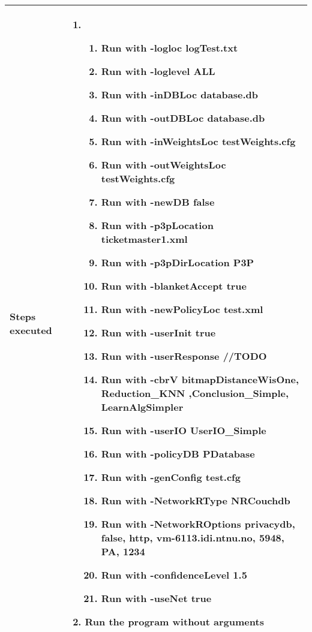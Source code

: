 \documentclass[10pt]{article}
\begin{document}
\begin{center}
\begin{longtable}{ | p{4cm} | p{10cm} | }
			Steps executed & 	\begin{enumerate}
							\item
							\begin{enumerate}
								\item Run with -logloc logTest.txt
								\item Run with -loglevel ALL
								\item Run with -inDBLoc database.db
								\item Run with -outDBLoc database.db
								\item Run with -inWeightsLoc testWeights.cfg
								\item Run with -outWeightsLoc testWeights.cfg
								\item Run with -newDB false
								\item Run with -p3pLocation ticketmaster1.xml
								\item Run with -p3pDirLocation P3P
								\item Run with -blanketAccept true
								\item Run with -newPolicyLoc test.xml
								\item Run with -userInit true
								\item Run with -userResponse //TODO
								\item Run with -cbrV bitmapDistanceWisOne, Reduction_KNN ,Conclusion_Simple, LearnAlgSimpler
								\item Run with -userIO UserIO_Simple
								\item Run with -policyDB PDatabase
								\item Run with -genConfig test.cfg
								\item Run with -NetworkRType NRCouchdb
								\item Run with -NetworkROptions privacydb, false, http, vm-6113.idi.ntnu.no, 5948, PA, 1234
								\item Run with -confidenceLevel 1.5
								\item Run with -useNet true
							\end{enumerate}
							\item Run the program without arguments
						\end{enumerate} \\ [3pt] \hline
			

\end{longtable}
\end{center}
\end{document}
